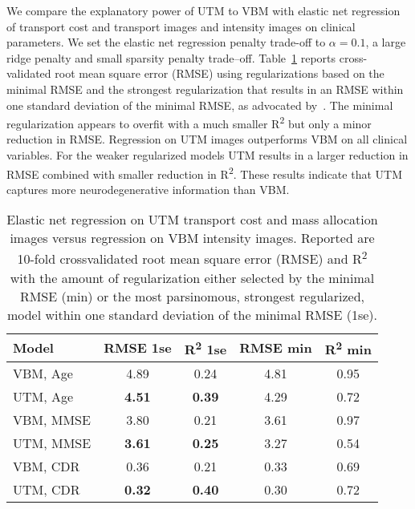 \documentclass{llncs}
\begin{document}
We compare the explanatory power of UTM to VBM with elastic net
regression~\cite{Zou05regularizationand} of transport cost and transport images
and intensity images on clinical parameters. We set the elastic net regression
penalty trade-off to $\alpha=0.1$, a large ridge penalty and small sparsity
penalty trade--off.  Table~\ref{fig:prediction} reports cross-validated root
mean square error (RMSE) using regularizations based on the minimal RMSE and
the strongest regularization that results in an RMSE within one standard
deviation of the minimal RMSE, as advocated by~\cite{Zou05regularizationand}.
The minimal regularization appears to overfit with a much smaller
R\textsuperscript{2}  but only a minor reduction in RMSE. Regression on UTM
images outperforms VBM on all clinical variables. For the weaker regularized
models UTM results in a larger reduction in RMSE combined with smaller
reduction in R\textsuperscript{2}.  These results indicate that UTM captures
more neurodegenerative information than VBM.
\begin{table}[h!]
\centering
\begin{tabular}{l|cc|cc}
  \parbox[b][4mm]{25mm }{Model  }  &
  \parbox[b][4mm]{17mm }{\centering RMSE 1se }  & 
  \parbox[b][4mm]{15mm }{\centering R\textsuperscript{2}  1se} & 
  \parbox[b][4mm]{17mm }{\centering RMSE min }  & 
  \parbox[b][4mm]{15mm }{\centering R\textsuperscript{2}  min} 
        \\ \hline \hline
  VBM, Age   & 4.89        & 0.24         & 4.81  & 0.95 \\
  UTM, Age   & {\bf 4.51}  & {\bf 0.39 }  & 4.29  & 0.72 \\ \hline
  VBM, MMSE  & 3.80        & 0.21         & 3.61  & 0.97 \\
  UTM, MMSE  & {\bf3.61 }  & {\bf 0.25}   & 3.27  & 0.54 \\ \hline
  VBM, CDR   & 0.36        & 0.21         & 0.33  & 0.69 \\
  UTM, CDR   & {\bf 0.32 } & {\bf 0.40 }  & 0.30  & 0.72 \\
\end{tabular} 
\caption{ \label{fig:prediction}  Elastic net regression on UTM transport cost
  and mass allocation images versus regression on VBM intensity images.
  Reported are 10-fold crossvalidated root mean square error (RMSE) and
  R\textsuperscript{2} with the amount of regularization either selected by the
  minimal RMSE (min) or the most parsinomous, strongest regularized, model
  within one standard deviation of the minimal RMSE (1se). 
  \vspace{-10mm}}
\end{table}
\end{document}
